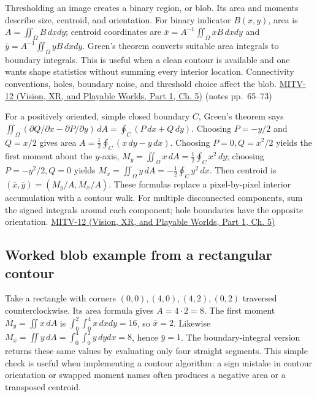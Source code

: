 Thresholding an image creates a binary region, or blob. Its area and moments describe size, centroid, and orientation. For binary indicator \(B(x,y)\), area is \(A=\iint_\Omega B\,dxdy\); centroid coordinates are \(\bar{x}=A^{-1}\iint_\Omega xB\,dxdy\) and \(\bar{y}=A^{-1}\iint_\Omega yB\,dxdy\). Green's theorem converts suitable area integrals to boundary integrals. This is useful when a clean contour is available and one wants shape statistics without summing every interior location. Connectivity conventions, holes, boundary noise, and threshold choice affect the blob. \href{../07-Vision-XR-and-Playable-Worlds-P01/main.pdf\#nameddest=04-visual-computing-ii-ch036-mitv-12---blob-analysis-binary-image-processing-greens-theorem-derivative-and-integral}{MITV-12 (Vision, XR, and Playable Worlds, Part 1, Ch. 5)} (notes pp.~65--73)

For a positively oriented, simple closed boundary \(C\), Green's theorem says \(\iint_\Omega(\partial Q/\partial x-\partial P/\partial y)\,dA=\oint_C(P\,dx+Q\,dy)\). Choosing \(P=-y/2\) and \(Q=x/2\) gives area \(A=\frac12\oint_C(x\,dy-y\,dx)\). Choosing \(P=0,Q=x^2/2\) yields the first moment about the \(y\)-axis, \(M_y=\iint_\Omega x\,dA=\frac12\oint_Cx^2\,dy\); choosing \(P=-y^2/2,Q=0\) yields \(M_x=\iint_\Omega y\,dA=-\frac12\oint_Cy^2\,dx\). Then centroid is \((\bar{x},\bar{y})=(M_y/A,M_x/A)\). These formulas replace a pixel-by-pixel interior accumulation with a contour walk. For multiple disconnected components, sum the signed integrals around each component; hole boundaries have the opposite orientation. \href{../07-Vision-XR-and-Playable-Worlds-P01/main.pdf\#nameddest=04-visual-computing-ii-ch036-mitv-12---blob-analysis-binary-image-processing-greens-theorem-derivative-and-integral}{MITV-12 (Vision, XR, and Playable Worlds, Part 1, Ch. 5)}

\subsection{Worked blob example from a rectangular contour}\label{04-visual-computing-ii-ch030-worked-blob-example-from-a-rectangular-contour}

\hypertarget{04-visual-computing-ii-ch030-worked-blob-example-from-a-rectangular-contour}{}

Take a rectangle with corners \((0,0),(4,0),(4,2),(0,2)\) traversed counterclockwise. Its area formula gives \(A=4\cdot2=8\). The first moment \(M_y=\iint x\,dA\) is \(\int_0^2\int_0^4x\,dxdy=16\), so \(\bar{x}=2\). Likewise \(M_x=\iint y\,dA=\int_0^4\int_0^2y\,dydx=8\), hence \(\bar{y}=1\). The boundary-integral version returns these same values by evaluating only four straight segments. This simple check is useful when implementing a contour algorithm: a sign mistake in contour orientation or swapped moment names often produces a negative area or a transposed centroid.

